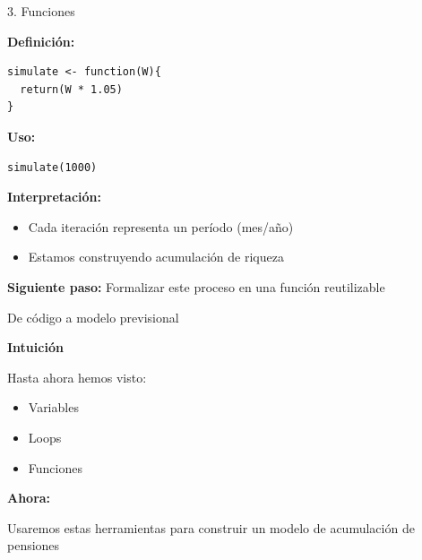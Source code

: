 \documentclass[10pt]{beamer}
\begin{document}
\begin{frame}[fragile]{3. Funciones}

\textbf{Definición:}

\begin{verbatim}
simulate <- function(W){
  return(W * 1.05)
}
\end{verbatim}

\vspace{0.3cm}

\textbf{Uso:}

\begin{verbatim}
simulate(1000)
\end{verbatim}

\textbf{Interpretación:}

\begin{itemize}
\item Cada iteración representa un período (mes/año)
\item Estamos construyendo acumulación de riqueza
\end{itemize}

\vspace{0.3cm}

\textbf{Siguiente paso:}
Formalizar este proceso en una función reutilizable
\end{frame}
\begin{frame}{De código a modelo previsional}

\textbf{Intuición}

\vspace{0.3cm}
Hasta ahora hemos visto:

\begin{itemize}
\item Variables
\item Loops
\item Funciones
\end{itemize}

\vspace{0.4cm}

\textbf{Ahora:}

Usaremos estas herramientas para construir un modelo de acumulación de pensiones

\end{frame}
\end{document}
